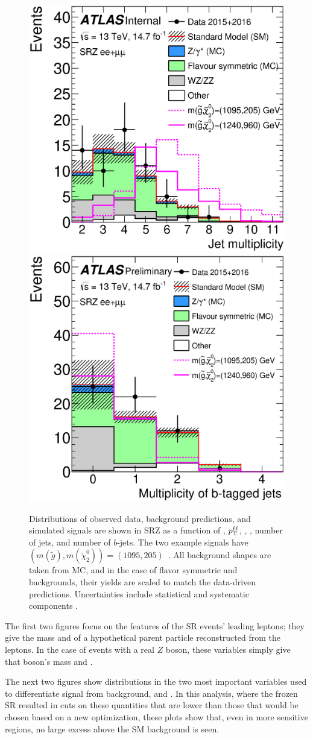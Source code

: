 \begin{centering}
\begin{figure}[!hbt]
\includegraphics[width=.48\linewidth]{figures/results/njets_ee_mm_srz_R_a.eps}
\includegraphics[width=.48\linewidth]{figures/results/nbjets_ee_mm_srz_R_a.eps}
\caption{ Distributions of observed data, background predictions, and simulated signals are shown in SRZ as a function of \mll, $p_{\text{T}}^{\ell\ell}$, \met, \HT, number of jets, and number of $b$-jets. The two example signals have $(m(\tilde{g}),m(\tilde{\chi}^{0}_{2}))=(1095, 205)$~\GeV. All background shapes are taken from \ac{MC}, and in the case of flavor symmetric and \dyjets backgrounds, their yields are scaled to match the data-driven predictions. Uncertainties include statistical and systematic components \cite{this_paper}.}
\label{fig:results_srdists}
\end{figure}
\end{centering}

The first two figures focus on the features of the \ac{SR} events' leading leptons; they give the mass and \pt of a hypothetical parent particle reconstructed from the leptons. In the case of events with a real $Z$ boson, these variables simply give that boson's mass and \pt. 

The next two figures show distributions in the two most important variables used to differentiate signal from background, \met and \HT. In this analysis, where the frozen \ac{SR} resulted in cuts on these quantities that are lower than those that would be chosen based on a new optimization, these plots show that, even in more sensitive regions, no large excess above the \ac{SM} background is seen. 


